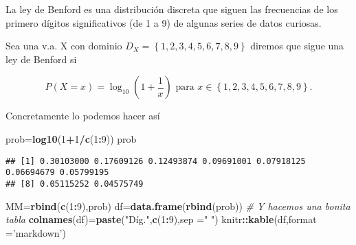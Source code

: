 \documentclass[
]{article}
\newenvironment{Shaded}{\begin{snugshade}}{\end{snugshade}}
\newcommand{\CommentTok}[1]{\textcolor[rgb]{0.56,0.35,0.01}{\textit{#1}}}
\newcommand{\DataTypeTok}[1]{\textcolor[rgb]{0.13,0.29,0.53}{#1}}
\newcommand{\DecValTok}[1]{\textcolor[rgb]{0.00,0.00,0.81}{#1}}
\newcommand{\KeywordTok}[1]{\textcolor[rgb]{0.13,0.29,0.53}{\textbf{#1}}}
\newcommand{\NormalTok}[1]{#1}
\newcommand{\OperatorTok}[1]{\textcolor[rgb]{0.81,0.36,0.00}{\textbf{#1}}}
\newcommand{\StringTok}[1]{\textcolor[rgb]{0.31,0.60,0.02}{#1}}
\begin{document}
La ley de Benford es una distribución discreta que siguen las
frecuencias de los primero dígitos significativos (de 1 a 9) de algunas
series de datos curiosas.

Sea una v.a. X con dominio \(D_X=\left\{1,2,3,4,5,6,7,8,9\right\}\)
diremos que sigue una ley de Benford si

\[P(X=x)=\log_{10} \left(1+\frac{1}{x}\right)\mbox{ para } x\in \left\{1,2,3,4,5,6,7,8,9\right\}.\]

Concretamente lo podemos hacer así

\begin{Shaded}
\begin{Highlighting}[]
\NormalTok{prob=}\KeywordTok{log10}\NormalTok{(}\DecValTok{1}\OperatorTok{+}\DecValTok{1}\OperatorTok{/}\KeywordTok{c}\NormalTok{(}\DecValTok{1}\OperatorTok{:}\DecValTok{9}\NormalTok{))}
\NormalTok{prob}
\end{Highlighting}
\end{Shaded}

\begin{verbatim}
## [1] 0.30103000 0.17609126 0.12493874 0.09691001 0.07918125 0.06694679 0.05799195
## [8] 0.05115252 0.04575749
\end{verbatim}

\begin{Shaded}
\begin{Highlighting}[]
\NormalTok{MM=}\KeywordTok{rbind}\NormalTok{(}\KeywordTok{c}\NormalTok{(}\DecValTok{1}\OperatorTok{:}\DecValTok{9}\NormalTok{),prob)}
\NormalTok{df=}\KeywordTok{data.frame}\NormalTok{(}\KeywordTok{rbind}\NormalTok{(prob))}
\CommentTok{# Y hacemos una bonita tabla}
\KeywordTok{colnames}\NormalTok{(df)=}\KeywordTok{paste}\NormalTok{(}\StringTok{"Díg."}\NormalTok{,}\KeywordTok{c}\NormalTok{(}\DecValTok{1}\OperatorTok{:}\DecValTok{9}\NormalTok{),}\DataTypeTok{sep =}\StringTok{" "}\NormalTok{)}
\NormalTok{knitr}\OperatorTok{::}\KeywordTok{kable}\NormalTok{(df,}\DataTypeTok{format =}\StringTok{'markdown'}\NormalTok{)}
\end{Highlighting}
\end{Shaded}
\end{document}
